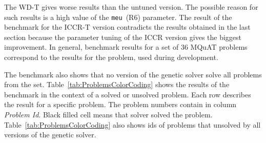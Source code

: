 The WD-T gives worse results than the untuned version. The possible reason for such results is a high value of the \texttt{meu}~(R6) parameter. The result of the benchmark for the ICCR-T version contradicts the results obtained in the last section because the parameter tuning of the ICCR version gives the biggest improvement. In general, benchmark results for a set of 36 MQuAT problems correspond to the results for the problem, used during development.

The benchmark also shows that no version of the genetic solver solve all problems from the set. Table~\ref{tab:ProblemsColorCoding} shows the results of the benchmark in the context of a solved or unsolved problem. Each row describes the result for a specific problem. The problem numbers contain in column \textit{Problem Id}. Black filled cell means that solver solved the problem. Table~\ref{tab:ProblemsColorCoding} also shows ids of problems that unsolved by all versions of the genetic solver.

